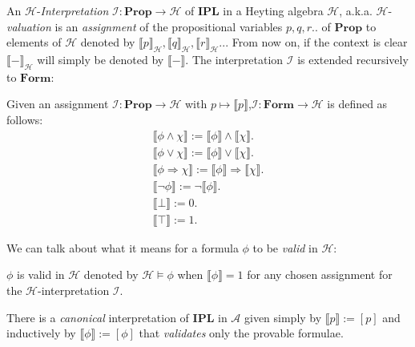 		An $\mathcal{H}$-\emph{Interpretation} $\mathcal{I}: \mathbf{Prop} \rightarrow \mathcal{H}$ of \textbf{IPL} in a Heyting algebra $\mathcal{H}$, a.k.a. $\mathcal{H}$-\emph{valuation} is an \emph{assignment} of the propositional variables $p,q,r..$ of $\mathbf{Prop}$ to elements of $\mathcal{H}$ denoted by $\llbracket p \rrbracket_{\mathcal{H}}, \llbracket q \rrbracket_{\mathcal{H}}, \llbracket r \rrbracket_{\mathcal{H}}$...\newline
		From now on, if the context is clear $\llbracket - \rrbracket_{\mathcal{H}}$ will simply be denoted by $\llbracket - \rrbracket$. \newline 
		The interpretation  $\mathcal{I}$ is extended recursively to $\mathbf{Form}$:
		\begin{definition}[H.A. interpretation]
			Given an assignment $\mathcal{I}: \mathbf{Prop} \rightarrow \mathcal{H}$ with $p \mapsto \llbracket p \rrbracket$,\newline $\mathcal{I}: \mathbf{Form} \rightarrow \mathcal{H}$ is defined as follows:
			\begin{gather*}
			\llbracket \phi \land \chi \rrbracket := \llbracket \phi \rrbracket \land \llbracket \chi \rrbracket .\\
			\llbracket \phi \lor \chi \rrbracket := \llbracket \phi \rrbracket \lor \llbracket \chi \rrbracket .
			\\
			\llbracket \phi \Rightarrow \chi \rrbracket := \llbracket \phi \rrbracket \Rightarrow \llbracket \chi \rrbracket .\\
			\llbracket \neg \phi \rrbracket := \neg\llbracket\phi\rrbracket. \\
			 \llbracket \bot \rrbracket := 0. 
			 \\ \llbracket \top \rrbracket := 1.
			\end{gather*}
		\end{definition}

		We can talk about what it means for a formula $\phi$ to be \emph{valid} in $ \mathcal{H} $:
		
		\begin{definition}[validity in HA]
		$\phi$ is valid in $\mathcal{H}$ denoted by $\mathcal{H} \models \phi$ when $\llbracket \phi \rrbracket = 1$ for any chosen assignment for the $\mathcal{H}$-interpretation $\mathcal{I}$.
		\end{definition}
	
				There is a \emph{canonical} interpretation of \textbf{IPL} in $\mathcal{A}$ given simply by $\llbracket p \rrbracket := [p]$ and inductively by $\llbracket \phi \rrbracket := [\phi]$ that \emph{validates} only the provable formulae.
	
